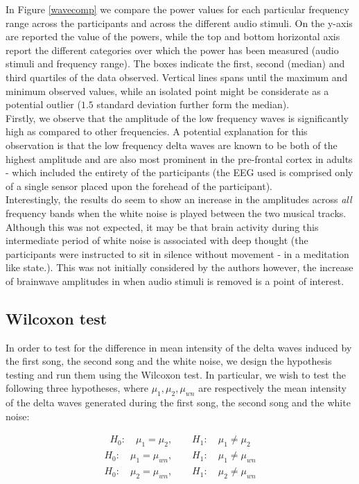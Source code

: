 \documentclass[twocolumn,superscriptaddress]{revtex4-1}
\theoremstyle{definition}
\theoremstyle{remark}
\begin{document}
In Figure \ref{wavecomp} we compare the power values for each particular frequency range across the participants and across the different audio stimuli. On the y-axis are reported the value of the powers, while the top and bottom horizontal axis report the different categories over which the power has been measured (audio stimuli and frequency range). The boxes indicate the first, second (median) and third quartiles of the data observed. Vertical lines spans until the maximum and minimum observed values, while an isolated point might be considerate as a potential outlier ($1.5$ standard deviation further form the median). \\
Firstly, we observe that the amplitude of the low frequency waves is significantly high as compared to other frequencies. A potential explanation for this observation is that the low frequency delta waves are known to be both of the highest amplitude and are also most prominent in the pre-frontal cortex in adults - which included the entirety of the participants  (the EEG used is comprised only of a single sensor placed upon the forehead of the participant). \\
Interestingly, the results do seem to show an increase in the amplitudes across \emph{all} frequency bands when the white noise is played between the two musical tracks. Although this was not expected, it may be that brain activity during this intermediate period of white noise is associated with deep thought (the participants were instructed to sit in silence without movement - in a meditation like state.). This was not initially considered by the authors however, the increase of brainwave amplitudes in when audio stimuli is removed is a point of interest. \\
 

\subsection{Wilcoxon test}
In order to test for the difference in mean intensity of the delta waves induced by the first song, the second song and the white noise, we design the hypothesis testing and run them using the Wilcoxon test. In particular, we wish to test the following three hypotheses, where $\mu_1, \mu_2, \mu_{wn}$ are respectively the mean intensity of the delta waves generated during the first song, the second song and the white noise:

\begin{align}
\label{f1}
H_0: \quad \mu_1 = \mu_2 , \qquad H_1: \quad \mu_1 \neq \mu_2
\end{align}
\begin{align}
\label{f2}
H_0: \quad \mu_1 = \mu_{wn} , \qquad H_1: \quad \mu_1 \neq \mu_{wn}
\end{align}
\begin{align}
\label{f3}
H_0: \quad \mu_2 = \mu_{wn} , \qquad H_1: \quad \mu_2 \neq \mu_{wn}
\end{align}
\end{document}
